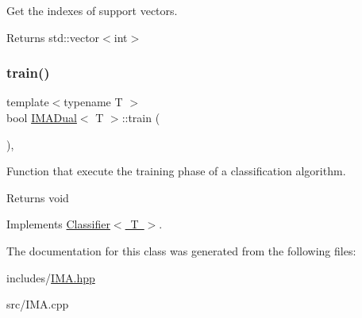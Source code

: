Get the indexes of support vectors. 

\begin{DoxyReturn}{Returns}
std\+::vector$<$int$>$ 
\end{DoxyReturn}
\mbox{\label{class_i_m_a_dual_aff820af6454ceeef4d23af48476d7218}} 
\subsubsection{\texorpdfstring{train()}{train()}}
{\footnotesize\ttfamily template$<$typename T $>$ \\
bool \mbox{\hyperlink{class_i_m_a_dual}{I\+M\+A\+Dual}}$<$ T $>$\+::train (\begin{DoxyParamCaption}{ }\end{DoxyParamCaption})\hspace{0.3cm}{\ttfamily [override]}, {\ttfamily [virtual]}}



Function that execute the training phase of a classification algorithm. 

\begin{DoxyReturn}{Returns}
void 
\end{DoxyReturn}


Implements \mbox{\hyperlink{class_classifier_a120849bfdfa3ba7a0388b32b2d76bf4f}{Classifier$<$ T $>$}}.



The documentation for this class was generated from the following files\+:\begin{DoxyCompactItemize}
\item 
includes/\mbox{\hyperlink{_i_m_a_8hpp}{I\+M\+A.\+hpp}}\item 
src/I\+M\+A.\+cpp\end{DoxyCompactItemize}
